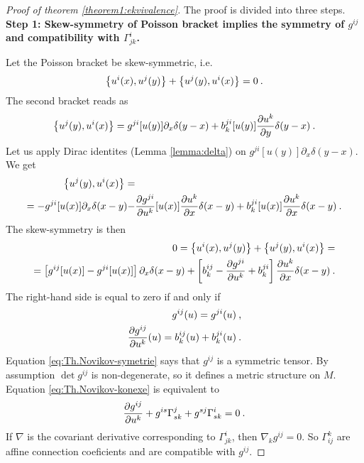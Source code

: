 \begin{proof}[Proof of theorem \ref{theorem1:ekvivalence}]
    The proof is divided into three steps.
    \\
    \textbf{Step 1: Skew-symmetry of Poisson bracket implies the symmetry of $g^{ij}$ and compatibility with $\Gamma^i_{jk}$.}

    Let the Poisson bracket be skew-symmetric, i.e.
    \begin{align}
        \left \lbrace u^i(x),u^j(y) \right \rbrace + \left \lbrace u^j(y),u^i(x) \right \rbrace = 0 \:.
    \end{align}
    The second bracket reads as
    \begin{align}
        \left \lbrace u^j(y),u^i(x) \right \rbrace =  g^{ji}[u(y)] \partial_x \delta(y-x) + b^{ji}_k[u(y)] \frac{\partial u^k}{\partial y} \delta(y-x) \:.
    \end{align}
    Let us apply Dirac identites (Lemma \vref{lemma:delta}) on $g^{ji}[u(y)]\partial_x \delta(y-x)$. We get
    \begin{align}
        \left \lbrace u^j(y),u^i(x) \right \rbrace =& \nonumber \\ 
        = - g^{ji} [u(x)] \partial_x \delta(x-y) -& \frac{\partial g^{ji}}{\partial u^k}[u(x)] \frac{\partial u^k}{\partial x} \delta(x-y) + b^{ji}_k[u(x)] \frac{\partial u^k}{\partial x} \delta(x-y)
        \:.
    \end{align}
    The skew-symmetry is then
    \begin{align}
        0 = \left \lbrace u^i(x),u^j(y) \right \rbrace + \left \lbrace u^j(y),u^i(x) \right \rbrace = \nonumber
        \\= \left[ g^{ij}[u(x)]  - g^{ji}[u(x)] \right] \partial_x \delta(x-y) + \left[ b^{ij}_k - \frac{\partial g^{ji}}{\partial u^k}  + b^{ji}_k  \right] \frac{\partial u^k}{\partial x} \delta(x-y) \:.
    \end{align}
    The right-hand side is equal to zero if and only if
    \begin{align}
        g^{ij}(u) = g^{ji}(u) \:, \label{eq:Th.Novikov-symetrie} \\
        \frac{\partial g^{ij}}{\partial u^k}(u) = b^{ij}_k(u) + b^{ji}_k(u)  \:. \label{eq:Th.Novikov-konexe}
    \end{align}
    Equation \eqref{eq:Th.Novikov-symetrie} says that $g^{ij}$ is a symmetric tensor. By assumption $\det g^{ij}$ is non-degenerate, so it defines a metric structure on $M$. Equation \eqref{eq:Th.Novikov-konexe} is equivalent to
    \begin{align}
        \frac{\partial g^{ij}}{\partial u^k} + g^{is} \Gamma_{sk}^j + g^{sj} \Gamma_{sk}^i = 0 \:.
    \end{align}
    If $\nabla$ is the covariant derivative corresponding to $\Gamma^i_{jk}$, then $\nabla_k g^{ij} = 0$. So $\Gamma_{ij}^k$ are affine connection coeficients and are compatible with $g^{ij}$.


\end{proof}
